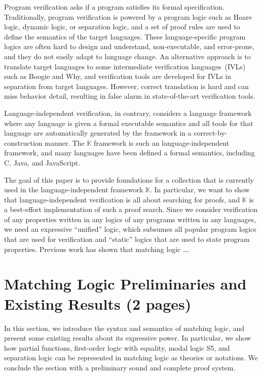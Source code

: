 \documentclass[acmsmall,review,anonymous]{acmart}
\newcommand{\K}{$\mathbb{K}$\xspace}
\begin{document}
Program verification asks if a program
satisfies its formal specification.
Traditionally, program verification is powered by
a program logic such as 
Hoare logic, dynamic logic, or separation logic,
and a set of proof rules are used to define
the semantics of the target languages.
These language-specific program logics are often hard to
design and understand, non-executable, and error-prone,
and they do not easily adapt to language change.
An alternative approach is to translate 
target languages to some 
intermediate verification languages~(IVLs)
such as Boogie and Why,
and verification tools are developed for IVLs
in separation from target languages.
However, correct translation is hard and can miss
behavior detail, resulting in
false alarm in state-of-the-art verification tools.

Language-independent verification, in contrary, 
considers a language framework
where any language is given a formal executable semantics
and all tools for that language
are automatically generated by the framework in a
correct-by-construction manner.
The \K framework is such an language-independent framework,
and many languages have been defined a formal semantics,
including C, Java, and JavaScript.

The goal of this paper is to provide foundations for
a collection that is currently used in the language-independent
framework \K.
In particular, we want to show that
language-independent verification is all about 
searching for proofs,
and \K is a best-effort implementation of such a proof search.
Since we consider verification of
any properties written in any logics 
of any programs written in any languages,
we need an expressive ``unified'' logic,
which subsumes all popular program logics that are used
for verification and ``static'' logics that are used
to state program properties. 
Previous work has shown that matching logic \dots.

\section{Matching Logic Preliminaries and Existing Results (2 pages)}

In this section, we introduce the syntax and semantics of matching logic,
and present some existing results about its expressive power.
In particular, we show how
partial functions,
first-order logic with equality,
modal logic S5,
and separation logic can be represented in matching logic
as theories or notations.
We conclude the section with a preliminary sound and complete proof system.
\end{document}
